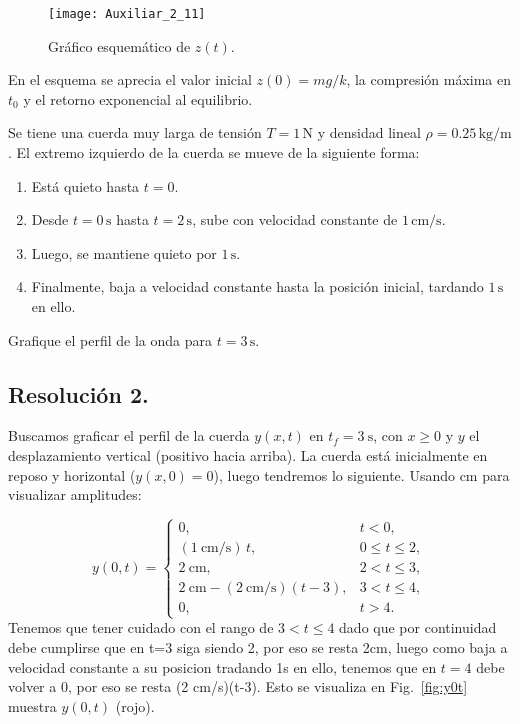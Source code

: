 \documentclass[
  11pt,
  letterpaper,
   addpoints,
  ]{exam}
\begin{document}
\begin{questions}
\begin{solution}
\begin{figure}[H]
  \centering
  \texttt{[image: Auxiliar\_2\_11]}
  \caption{Gráfico esquemático de $z(t)$.}
  \label{fig:grafico-z}
\end{figure}
En el esquema se aprecia el valor inicial $z(0)=mg/k$, la compresión máxima en $t_0$ y el retorno exponencial al equilibrio.
\end{solution}

\question  Se tiene una cuerda muy larga de tensión $T=1\,\mathrm{N}$ y densidad lineal $\rho=0.25\,\mathrm{kg/m}$.
El extremo izquierdo de la cuerda se mueve de la siguiente forma:
\begin{enumerate}
  \item Está quieto hasta $t=0$.
  \item Desde $t=0\,\mathrm{s}$ hasta $t=2\,\mathrm{s}$, sube con velocidad constante de $1\,\mathrm{cm/s}$.
  \item Luego, se mantiene quieto por $1\,\mathrm{s}$.
  \item Finalmente, baja a velocidad constante hasta la posición inicial, tardando $1\,\mathrm{s}$ en ello.
\end{enumerate}

Grafique el perfil de la onda para $t=3\,\mathrm{s}$.
\begin{solution}
\subsection*{Resolución 2.}
Buscamos graficar el perfil de la cuerda $y(x,t)$ en $t_f=3~\text{s}$, con $x\ge 0$ y $y$ el desplazamiento vertical (positivo hacia arriba). La cuerda está inicialmente en reposo y horizontal ($y(x,0)=0$), luego tendremos lo siguiente. Usando cm para visualizar amplitudes:

\begin{equation}
y(0,t)=
\begin{cases}
0, & t<0,\\[2mm]
(1~\text{cm/s})\,t, & 0\le t \le 2,\\[2mm]
2~\text{cm}, & 2< t \le 3,\\[2mm]
2~\text{cm}- (2~\text{cm/s})(t-3), & 3< t \le 4,\\[2mm]
0, & t>4.
\end{cases}
\label{eq:y0t}
\end{equation}
Tenemos que tener cuidado con el rango de $3<t\leq 4$ dado que por continuidad debe cumplirse que en t=3 siga siendo 2, por eso se resta 2cm, luego como baja a velocidad constante a su posicion tradando 1s en ello, tenemos que en $t=4$ debe volver a 0, por eso se resta (2 cm/s)(t-3). Esto se visualiza en Fig.~\ref{fig:y0t} muestra $y(0,t)$ (rojo).


\end{solution}
\end{questions}
\end{document}
